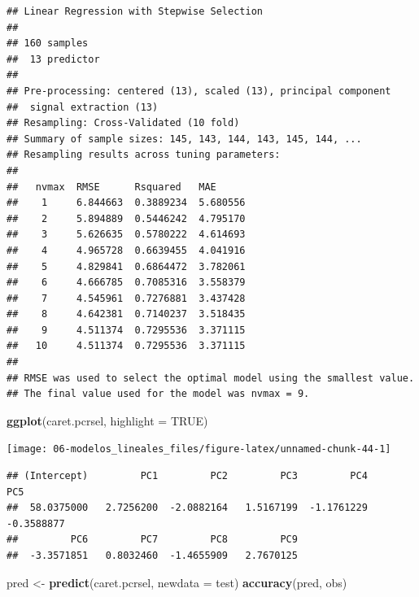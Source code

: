 \documentclass[
  spanish,
]{book}
\newenvironment{Shaded}{\begin{snugshade}}{\end{snugshade}}
\newcommand{\DataTypeTok}[1]{\textcolor[rgb]{0.13,0.29,0.53}{#1}}
\newcommand{\KeywordTok}[1]{\textcolor[rgb]{0.13,0.29,0.53}{\textbf{#1}}}
\newcommand{\NormalTok}[1]{#1}
\newcommand{\OperatorTok}[1]{\textcolor[rgb]{0.81,0.36,0.00}{\textbf{#1}}}
\newcommand{\OtherTok}[1]{\textcolor[rgb]{0.56,0.35,0.01}{#1}}
\newcommand{\StringTok}[1]{\textcolor[rgb]{0.31,0.60,0.02}{#1}}
\theoremstyle{break}
\theoremstyle{definition}
\theoremstyle{definition}
\theoremstyle{definition}
\theoremstyle{remark}
\begin{document}
\begin{verbatim}
## Linear Regression with Stepwise Selection 
## 
## 160 samples
##  13 predictor
## 
## Pre-processing: centered (13), scaled (13), principal component
##  signal extraction (13) 
## Resampling: Cross-Validated (10 fold) 
## Summary of sample sizes: 145, 143, 144, 143, 145, 144, ... 
## Resampling results across tuning parameters:
## 
##   nvmax  RMSE      Rsquared   MAE     
##    1     6.844663  0.3889234  5.680556
##    2     5.894889  0.5446242  4.795170
##    3     5.626635  0.5780222  4.614693
##    4     4.965728  0.6639455  4.041916
##    5     4.829841  0.6864472  3.782061
##    6     4.666785  0.7085316  3.558379
##    7     4.545961  0.7276881  3.437428
##    8     4.642381  0.7140237  3.518435
##    9     4.511374  0.7295536  3.371115
##   10     4.511374  0.7295536  3.371115
## 
## RMSE was used to select the optimal model using the smallest value.
## The final value used for the model was nvmax = 9.
\end{verbatim}

\begin{Shaded}
\begin{Highlighting}[]
\KeywordTok{ggplot}\NormalTok{(caret.pcrsel, }\DataTypeTok{highlight =} \OtherTok{TRUE}\NormalTok{)}
\end{Highlighting}
\end{Shaded}

\begin{center}\texttt{[image: 06-modelos\_lineales\_files/figure-latex/unnamed-chunk-44-1]} \end{center}

\begin{Shaded}
\end{Shaded}

\begin{verbatim}
## (Intercept)         PC1         PC2         PC3         PC4         PC5 
##  58.0375000   2.7256200  -2.0882164   1.5167199  -1.1761229  -0.3588877 
##         PC6         PC7         PC8         PC9 
##  -3.3571851   0.8032460  -1.4655909   2.7670125
\end{verbatim}

\begin{Shaded}
\begin{Highlighting}[]
\NormalTok{pred <-}\StringTok{ }\KeywordTok{predict}\NormalTok{(caret.pcrsel, }\DataTypeTok{newdata =}\NormalTok{ test)}
\KeywordTok{accuracy}\NormalTok{(pred, obs)}
\end{Highlighting}
\end{Shaded}
\end{document}
